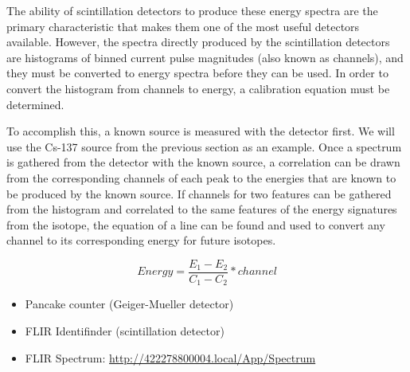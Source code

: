 \documentclass[11pt]{article}
\begin{document}

The ability of scintillation detectors to produce these energy spectra are the primary
characteristic that makes them one of the most useful detectors available. However, the spectra
directly produced by the scintillation detectors are histograms of binned current pulse magnitudes
(also known as channels), and they must be converted to energy spectra before they can be used. In
order to convert the histogram from channels to energy, a calibration equation must be determined.

To accomplish this, a known source is measured with the detector first. We will use the Cs-137
source from the previous section as an example. Once a spectrum is gathered from the detector with
the known source, a correlation can be drawn from the corresponding channels of each peak to the
energies that are known to be produced by the known source. If channels for two features can be
gathered from the histogram and correlated to the same features of the energy signatures from the
isotope, the equation of a line can be found and used to convert any channel to its corresponding
energy for future isotopes.

\begin{equation}
    Energy = \frac{E_1 - E_2}{C_1 - C_2} * channel
\end{equation}


\begin{itemize}
    \item Pancake counter (Geiger-Mueller detector)
    \item FLIR Identifinder (scintillation detector)
    \item FLIR Spectrum: \url{http://422278800004.local/App/Spectrum}
\end{itemize}

\end{document}

